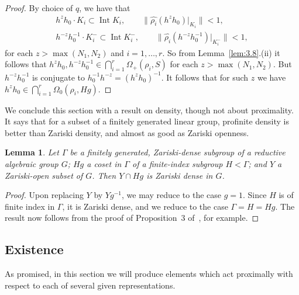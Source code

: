 \documentclass{amsart}
\theoremstyle{plain}
\newtheorem{lemma}[theorem]{Lemma}
\theoremstyle{definition}
\theoremstyle{remark}
\DeclareMathOperator{\Int}{Int}
\providecommand{\norm}[1]{\lVert#1\rVert}
\begin{document}
\begin{proof}
By choice of $q$, we have that
\begin{gather*}
h^{z}h_{0}\cdot K_{i} \subset \Int K_{i},\qquad
\norm{\widehat{\rho_{i}}(h^{z}h_{0})|_{K_{i}}} < 1,\\
h^{-z}h_{0}^{-1}\cdot K_{i}^{-} \subset \Int K_{i}^{-}, \qquad
\norm{\widehat{\rho_{i}}(h^{-z}h_{0}^{-1})|_{K_{i}^{-}}} < 1,
\end{gather*}
 for
each $z > \max(N_{1}, N_{2})$ and $i = 1,\ldots, r$. So from Lemma~\ref{lem:3.8}.(ii)
it follows that $h^{z}h_{0}, h^{-z}h_{0}^{-1} \in \bigcap_{i = 1}^{r} \Omega_{+}(\rho_{i},
S)$ for each $z > \max(N_{1}, N_{2})$. But $h^{-z}h_{0}^{-1}$ is conjugate to
$h_{0}^{-1}h^{-z} = (h^{z}h_{0})^{-1}$. It follows that for such $z$ we have
$h^{z}h_{0} \in \bigcap_{i = 1}^{r} \Omega_{0}(\rho_{i}, Hg)$.
\end{proof}

We conclude this section with a result on density, though not about proximality. It says
that for a subset of a finitely generated linear group, profinite density is better than
Zariski density, and almost as good as Zariski openness. 
\begin{lemma}\label{lem:YcapHg}
Let $\Gamma$ be a finitely generated, Zariski-dense subgroup of a reductive algebraic group
$G$; $Hg$ a coset in $\Gamma$ of a finite-index subgroup $H < \Gamma$; and $Y$ a Zariski-open subset
of $G$. Then $Y \cap Hg$ is Zariski dense in $G$. 
\end{lemma}
\begin{proof}
Upon replacing $Y$ by $Yg^{-1}$, we may reduce to the case $g = 1$. Since $H$ is of finite
index in $\Gamma$, it is Zariski dense, and we reduce to the case $\Gamma = H = Hg$.
The result now follows from the proof of Proposition~3 of~\cite{MR613853}, for example.
\end{proof}

\subsection{Existence}
As promised, in this section we will produce elements which act proximally
with respect to each of several given representations.
\end{document}
